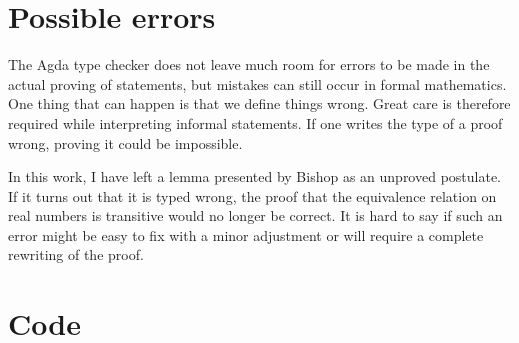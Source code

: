 \documentclass[11pt,a4paper]{article}
\begin{document}
\section{Possible errors}
The Agda type checker does not leave much room for errors to be made in the actual proving of statements, but mistakes can still occur in formal mathematics. One thing that can happen is that we define things wrong. Great care is therefore required while interpreting informal statements. If one writes the type of a proof wrong, proving it could be impossible.

In this work, I have left a lemma presented by Bishop as an unproved postulate. If it turns out that it is typed wrong, the proof that the equivalence relation on real numbers is transitive would no longer be correct. It is hard to say if such an error might be easy to fix with a minor adjustment or will require a complete rewriting of the proof.
\section{Code}
\end{document}
